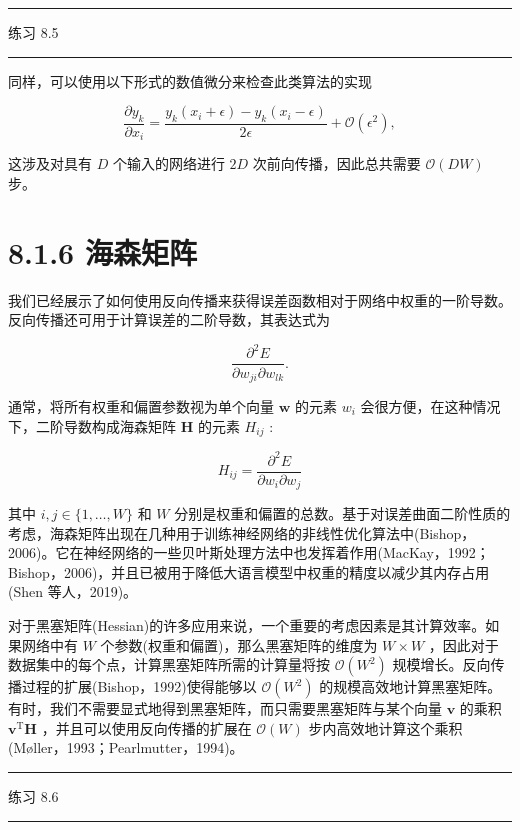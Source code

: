 \documentclass[10pt]{article}
\newcommand{\HRule}{\begin{center}\rule{0.9\linewidth}{0.2mm}\end{center}}
\begin{document}
\HRule

练习 8.5

\HRule

同样，可以使用以下形式的数值微分来检查此类算法的实现

\[
\frac{\partial {y}_{k}}{\partial {x}_{i}} = \frac{{y}_{k}\left( {{x}_{i} + \epsilon }\right)  - {y}_{k}\left( {{x}_{i} - \epsilon }\right) }{2\epsilon } + \mathcal{O}\left( {\epsilon }^{2}\right) , \tag{8.35}
\]

这涉及对具有 \(D\) 个输入的网络进行 \({2D}\) 次前向传播，因此总共需要 \(\mathcal{O}\left( {DW}\right)\) 步。

\section*{8.1.6 海森矩阵}

我们已经展示了如何使用反向传播来获得误差函数相对于网络中权重的一阶导数。反向传播还可用于计算误差的二阶导数，其表达式为

\[
\frac{{\partial }^{2}E}{\partial {w}_{ji}\partial {w}_{lk}}. \tag{8.36}
\]

通常，将所有权重和偏置参数视为单个向量 \(\mathbf{w}\) 的元素 \({w}_{i}\) 会很方便，在这种情况下，二阶导数构成海森矩阵 \(\mathbf{H}\) 的元素 \({H}_{ij}\) :

\[
{H}_{ij} = \frac{{\partial }^{2}E}{\partial {w}_{i}\partial {w}_{j}} \tag{8.37}
\]

其中 \(i,j \in  \{ 1,\ldots ,W\}\) 和 \(W\) 分别是权重和偏置的总数。基于对误差曲面二阶性质的考虑，海森矩阵出现在几种用于训练神经网络的非线性优化算法中(Bishop，2006)。它在神经网络的一些贝叶斯处理方法中也发挥着作用(MacKay，1992；Bishop，2006)，并且已被用于降低大语言模型中权重的精度以减少其内存占用(Shen 等人，2019)。

对于黑塞矩阵(Hessian)的许多应用来说，一个重要的考虑因素是其计算效率。如果网络中有 \(W\) 个参数(权重和偏置)，那么黑塞矩阵的维度为 \(W \times  W\) ，因此对于数据集中的每个点，计算黑塞矩阵所需的计算量将按 \(\mathcal{O}\left( {W}^{2}\right)\) 规模增长。反向传播过程的扩展(Bishop，1992)使得能够以 \(\mathcal{O}\left( {W}^{2}\right)\) 的规模高效地计算黑塞矩阵。有时，我们不需要显式地得到黑塞矩阵，而只需要黑塞矩阵与某个向量 \(\mathbf{v}\) 的乘积 \({\mathbf{v}}^{\mathrm{T}}\mathbf{H}\) ，并且可以使用反向传播的扩展在 \(\mathcal{O}\left( W\right)\) 步内高效地计算这个乘积(Møller，1993；Pearlmutter，1994)。

\HRule

练习 8.6

\HRule
\end{document}
